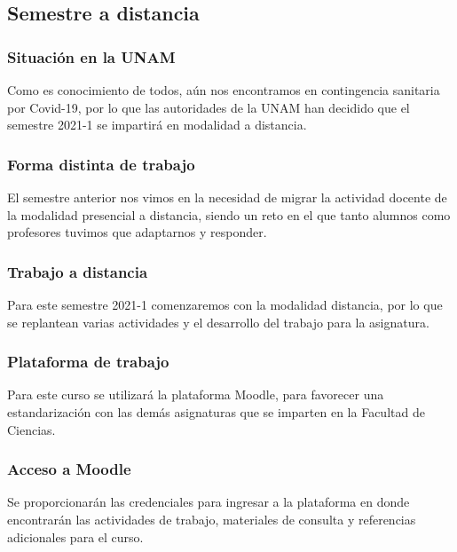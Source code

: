\subsection{Semestre a distancia}
\begin{frame}
\frametitle{Situación en la UNAM}
Como es conocimiento de todos, aún nos encontramos en contingencia sanitaria por Covid-19, por lo que las autoridades de la UNAM han decidido que el semestre 2021-1 se impartirá en modalidad a distancia.
\end{frame}
\begin{frame}
\frametitle{Forma distinta de trabajo}
El semestre anterior nos vimos en la necesidad de migrar la actividad docente de la modalidad presencial a distancia, siendo un reto en el que tanto alumnos como profesores tuvimos que adaptarnos y responder.
\end{frame}
\begin{frame}
\frametitle{Trabajo a distancia}
Para este semestre 2021-1 comenzaremos con la modalidad distancia, por lo que se replantean varias actividades y el desarrollo del trabajo para la asignatura.
\end{frame}
\begin{frame}
\frametitle{Plataforma de trabajo}
Para este curso se utilizará la plataforma Moodle, para favorecer una estandarización con las demás asignaturas que se imparten en la Facultad de Ciencias.
\end{frame}
\begin{frame}
\frametitle{Acceso a Moodle}
Se proporcionarán las credenciales para ingresar a la plataforma en donde encontrarán las actividades de trabajo, materiales de consulta y referencias adicionales para el curso.
\end{frame}
